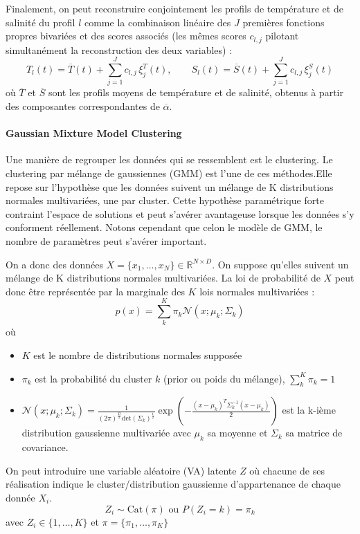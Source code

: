 \documentclass{article}
\begin{document}
	\vspace{1em}
	
	Finalement, on peut reconstruire conjointement les profils de température et de salinité du profil $l$ comme la combinaison linéaire des $J$ premières fonctions propres bivariées et des scores associés (les mêmes scores $c_{l,j}$ pilotant simultanément la reconstruction des deux variables) :
	\[
	T_l(t) = \overline{T}(t) + \sum_{j=1}^{J} c_{l,j}\, \xi_j^T(t), 
	\qquad
	S_l(t) = \overline{S}(t) + \sum_{j=1}^{J} c_{l,j}\, \xi_j^S(t)
	\]
	où $\overline{T}$ et $\overline{S}$ sont les profils moyens de température et de salinité, obtenus à partir des composantes correspondantes de $\overline\alpha$.
	
	\paragraph{Gaussian Mixture Model Clustering}
	Une manière de regrouper les données qui se ressemblent est le clustering. Le clustering par mélange de gaussiennes (GMM) est l'une de ces méthodes.Elle repose sur l'hypothèse que les données suivent un mélange de K distributions normales multivariées, une par cluster. Cette hypothèse paramétrique forte contraint l'espace de solutions et peut s'avérer avantageuse lorsque les données s'y conforment réellement. Notons cependant que celon le modèle de GMM, le nombre de paramètres peut s'avérer important. 
	
	On a donc des données $X = \{x_1, \ldots, x_N\} \in \mathbb{R}^{N \times D}$. On suppose qu'elles suivent un mélange de K distributions normales multivariées. La loi de probabilité de $X$ peut donc être représentée par la marginale des $K$ lois normales multivariées :
	\[
		p(x) = \sum_{k}^{K} \pi_k \mathcal{N}(x; \mu_k ; \Sigma_k)
	\]
	où 
	\begin{itemize}
		\item $K$ est le nombre de distributions normales supposée
		\item $\pi_k$ est la probabilité  du cluster $k$ (prior ou poids du mélange), $\sum_{k}^{K} \pi_k = 1$
		\item $\mathcal{N}(x; \mu_k ; \Sigma_k) = \frac{1}{(2\pi)^{\frac D 2} \text{det}(\Sigma_k)^{\frac 1 2}} \exp\left(-\frac{(x - \mu_k)^T \Sigma_k^{-1}(x - \mu_k)}{2}\right)$ est la k-ième distribution gaussienne multivariée avec $\mu_k$ sa moyenne et $\Sigma_k$ sa matrice de covariance. 
	\end{itemize}
	
	On peut introduire une variable aléatoire (VA) latente $Z$ où chacune de ses réalisation indique le cluster/distribution gaussienne d'appartenance de chaque donnée $X_i$. 
	\[
	Z_i \sim \text{Cat}(\pi) \text{ ou } P(Z_i = k) = \pi_k
	\]
	avec $Z_i \in \{1, \ldots, K \}$ et $\pi = \{\pi_1, \ldots, \pi_K\}$
	
\end{document}
